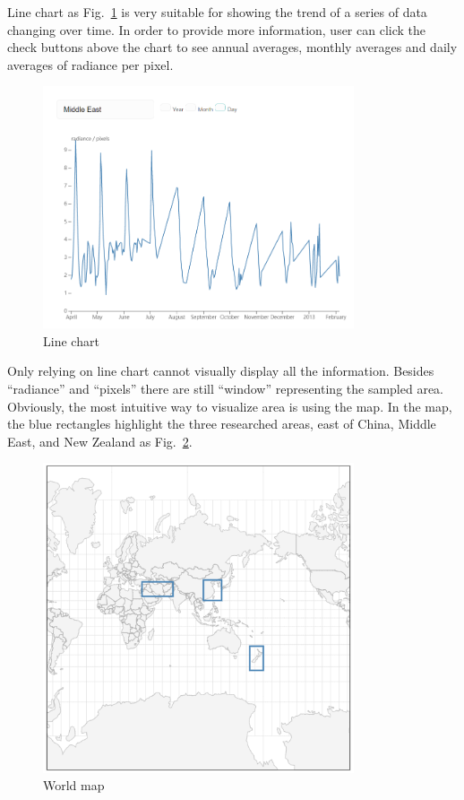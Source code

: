 \documentclass[conference]{IEEEtran}
\begin{document}
Line chart as Fig.~\ref{lchart} is very suitable for showing the trend of a series of data changing over time. In order to provide more 
information, user can click the check buttons above the chart to see annual averages, monthly averages and daily averages of radiance 
per pixel.  

\begin{figure}[htbp]
    \centerline{\includegraphics[width=260pt]{images/Line_chart.png}}
    \caption{Line chart}
    \label{lchart}
\end{figure}

Only relying on line chart cannot visually display all the information. Besides “radiance” and “pixels” there are still “window” representing the sampled area. Obviously, the most intuitive way to visualize area is using the map. In the map, the blue rectangles highlight the three researched areas, east of China, Middle East, and New Zealand as Fig.~\ref{wmap}.

\begin{figure}[htbp]
    \centerline{\includegraphics[width=260pt]{images/Worldmap.png}}
    \caption{World map}
    \label{wmap}
\end{figure}
\end{document}
